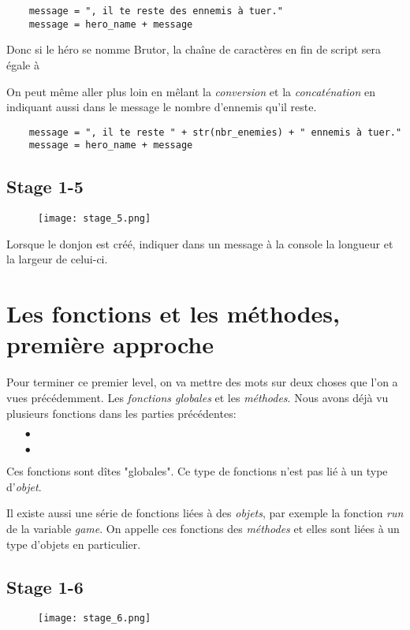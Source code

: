 \begin{lstlisting}
	message = ", il te reste des ennemis à tuer."
	message = hero_name + message
\end{lstlisting}

Donc si le héro se nomme Brutor, la chaîne de caractères en fin de script sera égale à 

On peut même aller plus loin en mêlant la \emph{conversion} et la \emph{concaténation} en indiquant aussi dans le message le nombre d'ennemis qu'il reste.

\begin{lstlisting}
	message = ", il te reste " + str(nbr_enemies) + " ennemis à tuer."
	message = hero_name + message
\end{lstlisting}

\subsection{Stage 1-5}
\begin{figure}[ht]
\texttt{[image: stage\_5.png]} 
\end{figure}

Lorsque le donjon est créé, indiquer dans un message à la console la longueur et la largeur de celui-ci.

\section{Les fonctions et les méthodes, première approche}

Pour terminer ce premier level, on va mettre des mots sur deux choses que l'on a vues précédemment. Les \emph{fonctions globales} et les \emph{méthodes}.
Nous avons déjà vu plusieurs fonctions dans les parties précédentes:
\begin{itemize}
	\item[$\bullet$] 
	\item[$\bullet$] 
\end{itemize}

Ces fonctions sont dîtes "globales". Ce type de fonctions n'est pas lié à un type d'\emph{objet}.

Il existe aussi une série de fonctions liées à des \emph{objets}, par exemple la fonction \emph{run} de la variable \emph{game}.
On appelle ces fonctions des \emph{méthodes} et elles sont liées à un type d'objets en particulier.

\subsection{Stage 1-6}
\begin{figure}[ht]
\texttt{[image: stage\_6.png]} 
\end{figure}

